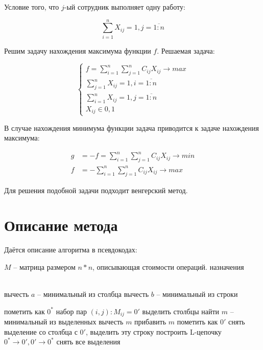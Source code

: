 \documentclass[a4paper,12pt]{article}
\numberwithin{equation}{section}
\begin{document}
Условие того, что $j$-ый сотрудник выполняет одну работу:

\[ \sum_{i=1}^n X_{ij} = 1, j=\overline{1:n} \]

Решим задачу нахождения максимума функции $f$. Решаемая задача:

\[
\begin{cases}
  f = \sum_{i=1}^n \sum_{j=1}^n C_{ij} X_{ij} \rightarrow max \\
  \sum_{j=1}^n X_{ij} = 1, i=\overline{1:n} \\
  \sum_{i=1}^n X_{ij} = 1, j=\overline{1:n} \\
  X_{ij} \in {0, 1}
\end{cases}
\]

В случае нахождения минимума функции задача приводится к задаче нахождения максимума:

\begin{align*}
  g &= -f = \sum_{i=1}^n \sum_{j=1}^n C_{ij} X_{ij} \rightarrow min \\
  f &= -\sum_{i=1}^n \sum_{j=1}^n C_{ij} X_{ij} \rightarrow max
\end{align*}

Для решения подобной задачи подходит венгерский метод.

\section{Описание метода}

Даётся описание алгоритма в псевдокодах:

\begin{algorithmic}
  \Require $M$ -- матрица размером $n*n$, описывающая стоимости операций.
  \Ensure назначения

   \\ 
    вычесть $a$ -- минимальный из столбца
  \EndFor
    вычесть $b$ -- минимальный из строки
  \EndFor
  
        пометить как $0^*$
      \EndIf
    \EndFor
      \Return набор пар $(i, j): M_{ij} = 0'$
    \EndIf
      выделить столбцы
    \EndFor
      найти $m$ -- минимальный из выделенных
        вычесть $m$
      \EndFor
        прибавить $m$
      \EndFor
    \EndIf
      пометить как $0'$
        снять выделение со столбца с $0'$, выделить эту строку
      \EndIf
      построить L-цепочку
      $0^* \rightarrow 0', 0' \rightarrow 0^*$
      снять все выделения
    \EndIf
  \EndWhile
\end{algorithmic}
\end{document}
